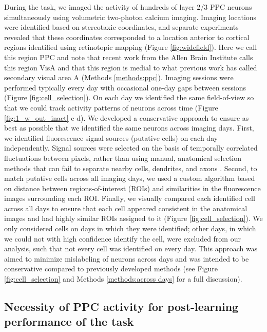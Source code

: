 During the task, we imaged the activity of hundreds of layer 2/3 PPC neurons simultaneously using volumetric two-photon calcium imaging. Imaging locations were identified based on stereotaxic coordinates, and separate experiments revealed that these coordinates corresponded to a location anterior to cortical regions identified using retinotopic mapping (Figure \ref{fig:widefield}). Here we call this region PPC and note that recent work from the Allen Brain Institute calls this region VisA  \citep{CCF2015} and that this region is medial to what previous work has called secondary visual area A \citep{Wang2007} (Methods \ref{methods:ppc}). Imaging sessions were performed typically every day with occasional one-day gaps between sessions (Figure \ref{fig:cell_selection}). On each day we identified the same field-of-view so that we could track activity patterns of neurons across time (Figure \ref{fig:1_w_out_inact} c-d). We developed a conservative approach to ensure as best as possible that we identified the same neurons across imaging days. First, we identified fluorescence signal sources (putative cells) on each day independently. Signal sources were selected on the basis of temporally correlated fluctuations between pixels, rather than using manual, anatomical selection methods that can fail to separate nearby cells, dendrites, and axons \citep{Hamel2015, Peron2015}. Second, to match putative cells across all imaging days, we used a custom algorithm based on distance between regions-of-interest (ROIs) and similarities in the fluorescence images surrounding each ROI. Finally, we visually compared each identified cell across all days to ensure that each cell appeared consistent in the anatomical images and had highly similar ROIs assigned to it (Figure \ref{fig:cell_selection}). We only considered cells on days in which they were identified; other days, in which we could not with high confidence identify the cell, were excluded from our analysis, such that not every cell was identified on every day. This approach was aimed to minimize mislabeling of neurons across days and was intended to be conservative compared to previously developed methods \citep{Huber2012, Liberti2016, Peron2015, Peters2014, Poort2015, Ziv2013} (see Figure \ref{fig:cell_selection} and Methods \ref{methods:across days} for a full discussion).  

\subsection{Necessity of PPC activity for post-learning performance of the task} \label{sec:chap3_necessity}

